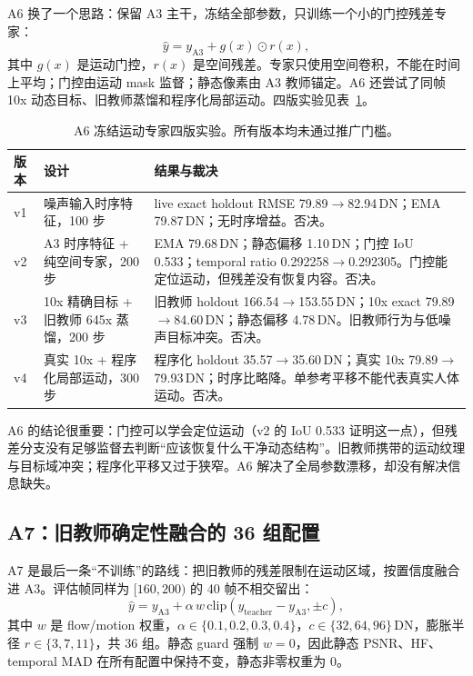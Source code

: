 \documentclass[11pt,a4paper,UTF8,fontset=fandol]{ctexart}
\newcommand{\dn}{\ensuremath{\,\mathrm{DN}}}
\begin{document}
A6 换了一个思路：保留 A3 主干，冻结全部参数，只训练一个小的门控残差专家：
\begin{equation}
\hat{y} = y_{\mathrm{A3}} + g(x)\odot r(x),
\label{eq:a6}
\end{equation}
其中 $g(x)$ 是运动门控，$r(x)$ 是空间残差。专家只使用空间卷积，不能在时间上平均；门控由运动 mask 监督；静态像素由 A3 教师锚定。A6 还尝试了同帧 10x 动态目标、旧教师蒸馏和程序化局部运动。四版实验见表~\ref{tab:a6}。

\begin{table}[H]
\centering
\small
\caption{A6 冻结运动专家四版实验。所有版本均未通过推广门槛。}
\label{tab:a6}
\begin{tabular}{p{}p{}p{}}
\toprule
版本 & 设计 & 结果与裁决 \\
\midrule
v1 & 噪声输入时序特征，100 步 & live exact holdout RMSE 79.89$\rightarrow$82.94\dn；EMA 79.87\dn；无时序增益。否决。 \\
v2 & A3 时序特征 + 纯空间专家，200 步 & EMA 79.68\dn；静态偏移 1.10\dn；门控 IoU 0.533；temporal ratio 0.292258$\rightarrow$0.292305。门控能定位运动，但残差没有恢复内容。否决。 \\
v3 & 10x 精确目标 + 旧教师 645x 蒸馏，200 步 & 旧教师 holdout 166.54$\rightarrow$153.55\dn；10x exact 79.89$\rightarrow$84.60\dn；静态偏移 4.78\dn。旧教师行为与低噪声目标冲突。否决。 \\
v4 & 真实 10x + 程序化局部运动，300 步 & 程序化 holdout 35.57$\rightarrow$35.60\dn；真实 10x 79.89$\rightarrow$79.93\dn；时序比略降。单参考平移不能代表真实人体运动。否决。 \\
\bottomrule
\end{tabular}
\end{table}

A6 的结论很重要：门控可以学会定位运动（v2 的 IoU 0.533 证明这一点），但残差分支没有足够监督去判断“应该恢复什么干净动态结构”。旧教师携带的运动纹理与目标域冲突；程序化平移又过于狭窄。A6 解决了全局参数漂移，却没有解决信息缺失。

\subsection{A7：旧教师确定性融合的 36 组配置}

A7 是最后一条“不训练”的路线：把旧教师的残差限制在运动区域，按置信度融合进 A3。评估帧同样为 $[160,200)$ 的 40 帧不相交留出：
\begin{equation}
\hat{y} = y_{\mathrm{A3}} + \alpha\,w\,\mathrm{clip}\left(y_{\mathrm{teacher}}-y_{\mathrm{A3}}, \pm c\right),
\label{eq:a7}
\end{equation}
其中 $w$ 是 flow/motion 权重，$\alpha\in\{0.1,0.2,0.3,0.4\}$，$c\in\{32,64,96\}$\dn，膨胀半径 $r\in\{3,7,11\}$，共 36 组。静态 guard 强制 $w=0$，因此静态 PSNR、HF、temporal MAD 在所有配置中保持不变，静态非零权重为 0。
\end{document}
